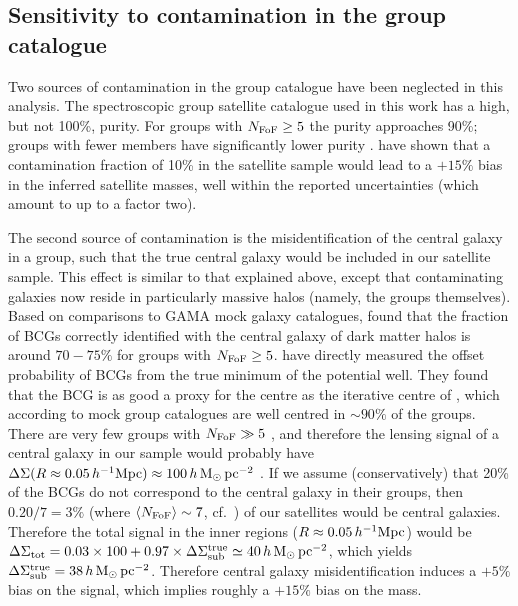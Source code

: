 \subsection{Sensitivity to contamination in the group catalogue}
\label{s:contamination}

Two sources of contamination in the group catalogue have been neglected in this analysis. The 
spectroscopic group satellite catalogue used in this work has a high, but not 100\%, purity. For 
groups with $N_{\rm FoF}\geq5$ the purity approaches 90\%; groups with fewer members 
have significantly lower purity \citep{robotham11}. \cite{li13_ggl} have shown that a contamination 
fraction of 10\% in the satellite sample would lead to a $+15\%$ bias in the inferred satellite 
masses, well within the reported uncertainties (which amount to up to a factor two).

The second source of contamination is the misidentification of the central galaxy in a group, 
such that the true central galaxy would be included in our satellite sample. This effect is similar 
to that explained above, except that contaminating galaxies now reside in particularly massive 
halos (namely, the groups themselves). Based on comparisons to GAMA mock galaxy catalogues, 
\cite{robotham11} found that the fraction of BCGs correctly identified with the central galaxy of 
dark matter halos is around $70-75\%$ for groups with $N_{\rm FoF}\geq5$. \cite{viola15} have 
directly measured the offset probability of BCGs from the true minimum of the potential well. They 
found that the BCG is as good a proxy for the centre as the iterative centre of \cite{robotham11}, 
which according to mock group catalogues are well centred in $\sim90\%$ of the groups. There 
are very few groups with $N_{\rm FoF}\gg5$ \citep{robotham11}, and therefore the lensing signal of a 
central galaxy in our sample would probably have $\Delta\Sigma(R\approx0.05\,h^{-1}{\rm 
Mpc})\approx100\,h\,\mathrm{M_\odot\,pc^{-2}}$ \citep[see Figure 7 of][]{viola15}. If we assume 
(conservatively) that 20\% of the BCGs do not correspond to the central galaxy in their groups, 
then $0.20/7=3\%$ (where $\langle N_{\rm FoF}\rangle\sim7$, cf.\ ) of our satellites 
would be central galaxies. Therefore the total signal in the inner regions 
($R\approx0.05\,h^{-1}{\rm Mpc}$) would be $\Delta\Sigma_{\rm tot}=0.03\times100 + 
0.97\times\Delta\Sigma_{\rm sub}^{\rm true}\simeq40\,h\,\mathrm{M_\odot\,pc^{-2}}$, which yields 
$\Delta\Sigma_{\rm sub}^{\rm true}=38\,h\,\mathrm{M_\odot\,pc^{-2}}$. Therefore central galaxy 
misidentification induces a $+5\%$ bias on the signal, which implies roughly a $+15\%$ bias on the 
mass.

